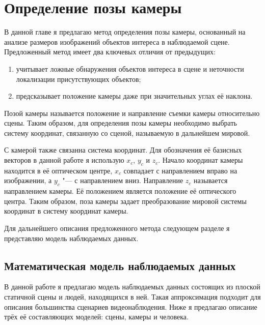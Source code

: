 

\chapter{Определение позы камеры}

В данной главе я предлагаю метод определения позы камеры, основанный на анализе размеров изображений объектов интереса в наблюдаемой сцене. Предложенный метод имеет два ключевых отличия от предыдущих:
\begin{enumerate}
\item учитывает ложные обнаружения объектов интереса в сцене и неточности локализации присутствующих объектов;
\item предсказывает положение камеры даже при значительных углах её наклона.
\end{enumerate}

Позой камеры называется положение и направление съемки камеры относительно сцены. Таким образом, для определения позы камеры необходимо выбрать систему координат, связанную со сценой, называемую в дальнейшем мировой.

С камерой также связанна система координат. Для обозначения её базисных векторов в данной работе я использую $x_c$, $y_c$ и $z_c$. Начало координат камеры находится в её оптическом центре, $x_c$ совпадает с направлением вправо на изображении, а $y_c$ "--- с направлением вниз. Направление $z_c$ называется направлением камеры. Её положением является положение её оптического центра. Таким образом, поза камеры задает преобразование мировой системы координат в систему координат камеры.

Для дальнейшего описания предложенного метода следующем разделе я представляю модель наблюдаемых данных.

\section{Математическая модель наблюдаемых данных}  \label{chap-cam_pose::sec-model}

В данной работе я предлагаю модель наблюдаемых данных состоящих из плоской статичной сцены и людей, находящихся в ней. Такая аппроксимация подходит для описания большинства сценариев видеонаблюдения. Ниже я предлагаю описание трёх её составляющих моделей: сцены, камеры и человека.

